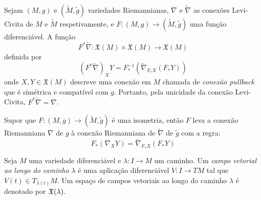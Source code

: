 \begin{observacao}
	Sejam $(M,g)$ e $(\tilde{M}, \tilde{g})$ variedades Riemannianas, $\nabla$ e $\tilde{\nabla}$ as conexões Levi-Civita de $M$ e $\tilde{M}$ respetivamente, e $F: (M,g) \rightarrow (\tilde{M},\tilde{g})$ uma função diferenciável. A função
	\begin{equation*}
	F^* \tilde{\nabla}: \mathfrak{X}(M) \times \mathfrak{X}(M) \rightarrow \mathfrak{X}(M)
	\end{equation*}
	definida por
	\begin{equation*}
	\left( F^* \tilde{\nabla} \right)_X Y = F^{-1}_* \left( \tilde{\nabla}_{F_* X} (F_* Y) \right)
	\end{equation*}
	onde $X,Y \in \mathfrak{X}(M)$ descreve uma conexão em $M$ chamada de \emph{conexão pullback} que é simétrica e compatível com $g$. Portanto, pela unicidade da conexão Levi-Civita, $F^* \tilde{\nabla} = \nabla$.
\end{observacao}

\begin{proposicao}
	Supor que $F: (M,g) \rightarrow (\tilde{M}, \tilde{g})$ é uma isometria, então $F$ leva a conexão Riemanniana $\nabla$ de $g$ à conexão Riemanniana de $\tilde{\nabla}$ de $\tilde{g}$ com a regra:
	\begin{equation*}
		F_* (\nabla_X Y) = \tilde{\nabla}_{F_* X} (F_* Y)
	\end{equation*}
\end{proposicao}



\begin{definicao}
	Seja $M$ uma variedade diferenciável e
	$\lambda: I \rightarrow M$ um caminho.
	Um \emph{campo vetorial ao longo do caminho} $\lambda$ é uma aplicação diferenciável $V: I \rightarrow TM$ tal que $V(t) \in T_{\lambda(t)} M$.
	Um espaço de campos vetoriais ao longo do caminho $\lambda$ é denotado por $\mathfrak{X}(\lambda)$.
\end{definicao}

